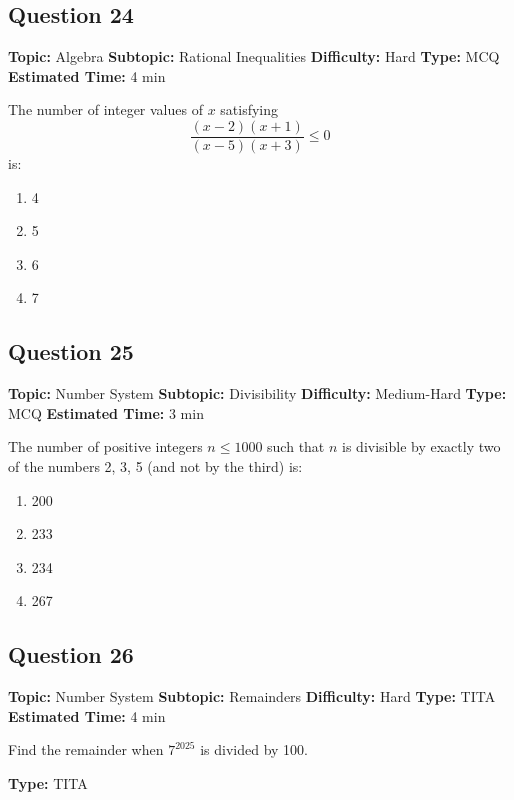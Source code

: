 \documentclass[11pt]{article}
\begin{document}
\subsection*{Question 24}
\textbf{Topic:} Algebra \quad \textbf{Subtopic:} Rational Inequalities \quad \textbf{Difficulty:} Hard \quad \textbf{Type:} MCQ \quad \textbf{Estimated Time:} 4 min

\begin{tcolorbox}
The number of integer values of $x$ satisfying
\[ \frac{(x - 2)(x + 1)}{(x - 5)(x + 3)} \le 0 \]
is:
\end{tcolorbox}
\begin{enumerate}[label=(\Alph*)]
\item 4
\item 5
\item 6
\item 7
\end{enumerate}

\subsection*{Question 25}
\textbf{Topic:} Number System \quad \textbf{Subtopic:} Divisibility \quad \textbf{Difficulty:} Medium-Hard \quad \textbf{Type:} MCQ \quad \textbf{Estimated Time:} 3 min

\begin{tcolorbox}
The number of positive integers $n \le 1000$ such that $n$ is divisible by exactly two of the numbers 2, 3, 5 (and not by the third) is:
\end{tcolorbox}
\begin{enumerate}[label=(\Alph*)]
\item 200
\item 233
\item 234
\item 267
\end{enumerate}

\subsection*{Question 26}
\textbf{Topic:} Number System \quad \textbf{Subtopic:} Remainders \quad \textbf{Difficulty:} Hard \quad \textbf{Type:} TITA \quad \textbf{Estimated Time:} 4 min

\begin{tcolorbox}
Find the remainder when $7^{2025}$ is divided by 100.
\end{tcolorbox}
\textbf{Type:} TITA
\end{document}
